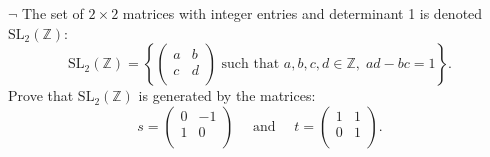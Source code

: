\documentclass[12pt,letterpaper,boxed]{hmcpset}
\newcommand{\SL}{\mathrm{SL}}
\newcommand{\Z}{\mathbb{Z}}
\begin{document}
\hypertarget{Exercise 6.10}{}	
\begin{problem}[6.10]	
$\neg$  The set of $2\times2$ matrices with integer entries and determinant 1 is denoted
$\SL_2(\Z)$:
\[
\SL_2(\Z) =
\left\{
\begin{pmatrix}
a & b\\
c & d\\
\end{pmatrix}
\text{ such that } a, b, c, d \in \Z,\;ad-bc = 1
\right\}.
\]
Prove that $\SL_2(\Z)$ is generated by the matrices:
\[
s =
\begin{pmatrix}
0 & -1\\
1 & 0\\
\end{pmatrix}
\quad\text{ and }\quad 
t =
\begin{pmatrix}
1 & 1\\
0 & 1\\
\end{pmatrix}.
\]
	
\end{problem}
\end{document}
